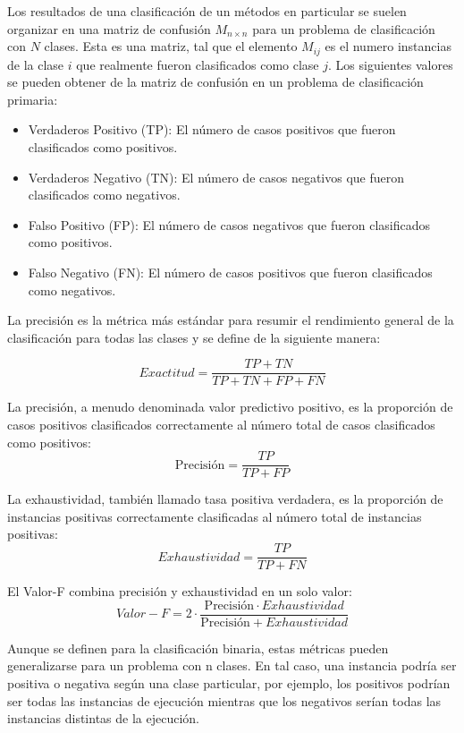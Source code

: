 Los resultados de una clasificación de un métodos en particular se
suelen organizar en una matriz de confusión $M_{n\times n}$ para
un problema de clasificación con $N$ clases. Esta es una matriz,
tal que el elemento $M_{ij}$ es el numero instancias de la clase
$i$ que realmente fueron clasificados como clase $j$. Los siguientes
valores se pueden obtener de la matriz de confusión en un problema
de clasificación primaria:
\begin{itemize}
\item Verdaderos Positivo (TP): El número de casos positivos que fueron
clasificados como positivos. 
\item Verdaderos Negativo (TN): El número de casos negativos que fueron
clasificados como negativos. 
\item Falso Positivo (FP): El número de casos negativos que fueron clasificados
como positivos. 
\item Falso Negativo (FN): El número de casos positivos que fueron clasificados
como negativos. 
\end{itemize}
La precisión es la métrica más estándar para resumir el rendimiento
general de la clasificación para todas las clases y se define de la
siguiente manera:

\begin{equation}
Exactitud=\frac{TP+TN}{TP+TN+FP+FN}
\end{equation}

La precisión, a menudo denominada valor predictivo positivo, es la
proporción de casos positivos clasificados correctamente al número
total de casos clasificados como positivos: 
\begin{equation}
\mbox{Precisión}=\frac{TP}{TP+FP}
\end{equation}

La exhaustividad, también llamado tasa positiva verdadera, es la proporción
de instancias positivas correctamente clasificadas al número total
de instancias positivas: 
\begin{equation}
Exhaustividad=\frac{TP}{TP+FN}
\end{equation}

El Valor-F combina precisión y exhaustividad en un solo valor: 
\begin{equation}
Valor-F=2\cdot\frac{\mbox{Precisión}\cdot Exhaustividad}{\mbox{Precisión}+Exhaustividad}
\end{equation}

Aunque se definen para la clasificación binaria, estas métricas pueden
generalizarse para un problema con n clases. En tal caso, una instancia
podría ser positiva o negativa según una clase particular, por ejemplo,
los positivos podrían ser todas las instancias de ejecución mientras
que los negativos serían todas las instancias distintas de la ejecución. 
